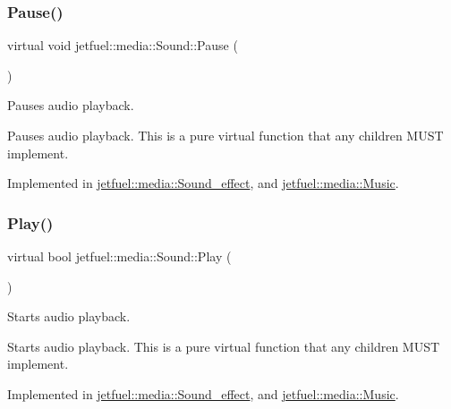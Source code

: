 \mbox{\label{classjetfuel_1_1media_1_1Sound_adb9cd45e23e6224760051e579aeefa7f}} 
\subsubsection{\texorpdfstring{Pause()}{Pause()}}
{\footnotesize\ttfamily virtual void jetfuel\+::media\+::\+Sound\+::\+Pause (\begin{DoxyParamCaption}{ }\end{DoxyParamCaption})\hspace{0.3cm}{\ttfamily [pure virtual]}}



Pauses audio playback. 

Pauses audio playback. This is a pure virtual function that any children M\+U\+ST implement. 

Implemented in \hyperlink{classjetfuel_1_1media_1_1Sound__effect_a5fa5bb67a349bac545f233a6aa8a030d}{jetfuel\+::media\+::\+Sound\+\_\+effect}, and \hyperlink{classjetfuel_1_1media_1_1Music_a002f31a60671c229bd054539caf537c5}{jetfuel\+::media\+::\+Music}.

\mbox{\label{classjetfuel_1_1media_1_1Sound_a8861a6671ce039522179d61085f240c8}} 
\subsubsection{\texorpdfstring{Play()}{Play()}}
{\footnotesize\ttfamily virtual bool jetfuel\+::media\+::\+Sound\+::\+Play (\begin{DoxyParamCaption}{ }\end{DoxyParamCaption})\hspace{0.3cm}{\ttfamily [pure virtual]}}



Starts audio playback. 

Starts audio playback. This is a pure virtual function that any children M\+U\+ST implement. 

Implemented in \hyperlink{classjetfuel_1_1media_1_1Sound__effect_a206d3653259cc854fd80fa44a9d333c4}{jetfuel\+::media\+::\+Sound\+\_\+effect}, and \hyperlink{classjetfuel_1_1media_1_1Music_afe9abee662a68ea9391e94e37c79945e}{jetfuel\+::media\+::\+Music}.

